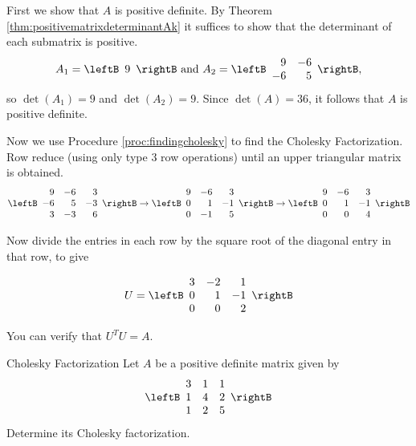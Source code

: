 \begin{solution}
First we show that $A$ is positive definite. By Theorem \ref{thm:positivematrixdeterminantAk} it suffices to show that the determinant of each submatrix is positive. 
\[ A_{1}=\leftB\begin{array}{c} 9 \end{array}\rightB
\mbox{ and }
A_{2}=\leftB\begin{array}{rr} 9 & -6 \\ -6 & 5 \end{array}\rightB,\]
so $\det(A_{1})=9$ and $\det(A_{2})=9$.
Since $\det(A)=36$, it follows that $A$ is positive definite.

Now we use Procedure \ref{proc:findingcholesky} to find the Cholesky Factorization. Row reduce (using only type $3$ row operations) until an upper triangular matrix is obtained. 
\[ \leftB\begin{array}{rrr}
9 & -6 & 3 \\ -6 & 5 & -3 \\ 3 & -3 & 6
\end{array}\rightB
\rightarrow
\leftB\begin{array}{rrr}
9 & -6 & 3 \\ 0 & 1 & -1 \\ 0 & -1 & 5
\end{array}\rightB
\rightarrow
\leftB\begin{array}{rrr}
9 & -6 & 3 \\ 0 & 1 & -1 \\ 0 & 0 & 4
\end{array}\rightB
\]

Now divide the entries in each row by the square root of the diagonal
entry in that row, to give

\[ U=\leftB\begin{array}{rrr}
3 & -2 & 1 \\ 0 & 1 & -1 \\ 0 & 0 & 2
\end{array}\rightB
\]

You can verify that $U^TU = A$.
\end{solution}

\begin{example}{Cholesky Factorization}\label{exa:cholesky}
Let $A$ be a positive definite matrix given by 
\begin{equation*}
\leftB
\begin{array}{ccc}
3 & 1 & 1 \\ 
1 & 4 & 2 \\ 
1 & 2 & 5
\end{array}
\rightB
\end{equation*}
Determine its Cholesky factorization.
\end{example}

